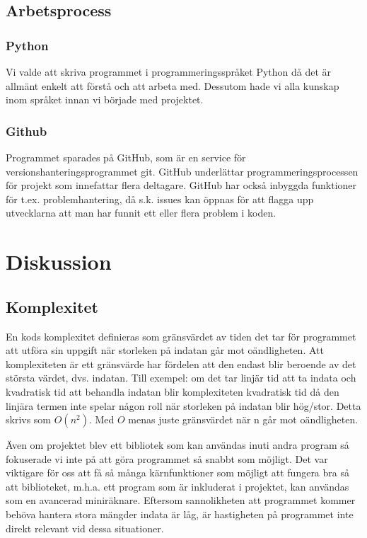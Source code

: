 \documentclass[12pt,a4paper]{article}
\begin{document}
\subsection{Arbetsprocess}
\subsubsection{Python}
Vi valde att skriva programmet i programmeringsspråket Python då det är allmänt enkelt att förstå och att arbeta med. Dessutom hade vi alla kunskap inom språket innan vi började med projektet.

\subsubsection{Github}
Programmet sparades på GitHub, som är en service för versionshanteringsprogrammet git. GitHub underlättar programmeringsprocessen för projekt som innefattar flera deltagare. GitHub har också inbyggda funktioner för t.ex. problemhantering, då s.k. issues kan öppnas för att flagga upp utvecklarna att man har funnit ett eller flera problem i koden.

\section{Diskussion}
\subsection{Komplexitet}
\label{subsec:Komplexitet}
En kods komplexitet definieras som gränsvärdet av tiden det tar för programmet att utföra sin uppgift när storleken på indatan går mot oändligheten. Att komplexiteten är ett gränsvärde har fördelen att den endast blir beroende av det största värdet, dvs. indatan. Till exempel: om det tar linjär tid att ta indata och kvadratisk tid att behandla indatan blir komplexiteten kvadratisk tid då den linjära termen inte spelar någon roll när storleken på indatan blir hög/stor. Detta skrivs som \(O(n^2)\). Med \(O\) menas juste gränsvärdet när n går mot oändligheten.
\par
Även om projektet blev ett bibliotek som kan användas inuti andra program så fokuserade vi inte på att göra programmet så snabbt som möjligt. Det var viktigare för oss att få så många kärnfunktioner som möjligt att fungera bra så att biblioteket, m.h.a. ett program som är inkluderat i projektet, kan användas som en avancerad miniräknare. Eftersom sannolikheten att programmet kommer behöva hantera stora mängder indata är låg, är hastigheten på programmet inte direkt relevant vid dessa situationer. 
\end{document}
